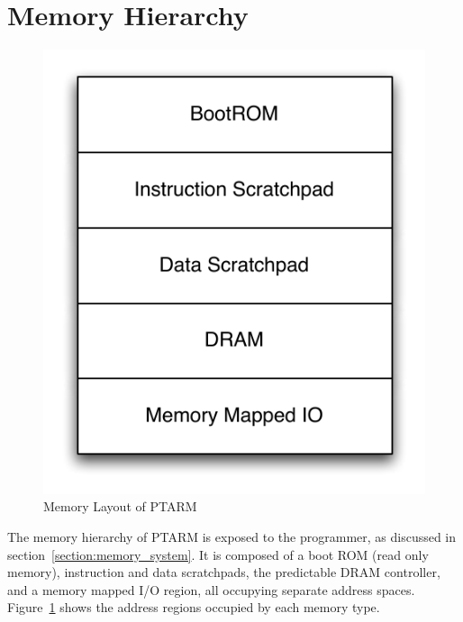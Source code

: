 \section{Memory Hierarchy}
\label{sec:ptarm_memory}


\begin{figure}
  \vspace{-20pt}
  \begin{center}
    \includegraphics[scale=.65]{figs/ptarm_memory_layout}
  \end{center}
  \vspace{-20pt}
  \caption{Memory Layout of PTARM}
  \label{fig:ptarm_memory_layout}
  \vspace{-10pt}
\end{figure} 
The memory hierarchy of PTARM is exposed to the programmer, as discussed in section~\ref{section:memory_system}.
It is composed of a boot ROM (read only memory), instruction and data scratchpads, the predictable DRAM controller, and a memory mapped I/O region, all occupying separate address spaces.
Figure~\ref{fig:ptarm_memory_layout} shows the address regions occupied by each memory type.  

